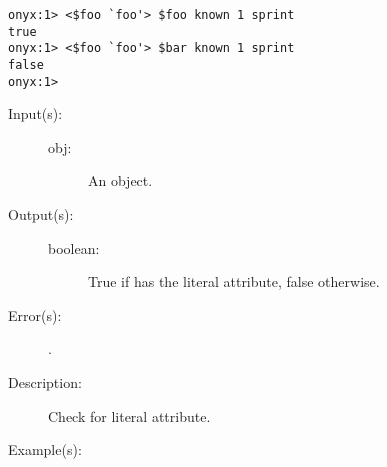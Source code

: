 \begin{description}
\begin{description}
\begin{verbatim}
onyx:1> <$foo `foo'> $foo known 1 sprint
true
onyx:1> <$foo `foo'> $bar known 1 sprint
false
onyx:1>
		\end{verbatim}
	\end{description}
\label{systemdict:lcheck}
\item[{\onyxop{obj}{lcheck}{boolean}}: ]
	\begin{description}\item[]
	\item[Input(s): ]
		\begin{description}\item[]
		\item[obj: ]
			An object.
		\end{description}
	\item[Output(s): ]
		\begin{description}\item[]
		\item[boolean: ]
			True if  has the literal attribute, false
			otherwise.
		\end{description}
	\item[Error(s): ]
		\begin{description}\item[]
		\item[.]
		\end{description}
	\item[Description: ]
		Check  for literal attribute.
	\item[Example(s): ]\begin{verbatim}


\end{verbatim}
\end{description}
\end{description}
